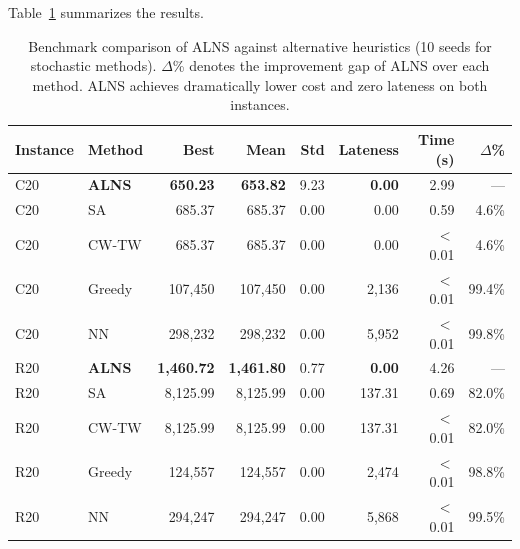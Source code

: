 \documentclass[11pt]{article}
\begin{document}
Table~\ref{tab:benchmark} summarizes the results.

\begin{table}[htbp]
\centering
\begin{tabular}{@{}llrrrrrr@{}}
\toprule
\textbf{Instance} & \textbf{Method} & \textbf{Best} & \textbf{Mean} & \textbf{Std} & \textbf{Lateness} & \textbf{Time (s)} & \textbf{$\Delta$\%} \\
\midrule
C20 & \textbf{ALNS} & \textbf{650.23} & \textbf{653.82} & 9.23 & \textbf{0.00} & 2.99 & --- \\
C20 & SA & 685.37 & 685.37 & 0.00 & 0.00 & 0.59 & 4.6\% \\
C20 & CW-TW & 685.37 & 685.37 & 0.00 & 0.00 & $<$0.01 & 4.6\% \\
C20 & Greedy & 107,450 & 107,450 & 0.00 & 2,136 & $<$0.01 & 99.4\% \\
C20 & NN & 298,232 & 298,232 & 0.00 & 5,952 & $<$0.01 & 99.8\% \\
\midrule
R20 & \textbf{ALNS} & \textbf{1,460.72} & \textbf{1,461.80} & 0.77 & \textbf{0.00} & 4.26 & --- \\
R20 & SA & 8,125.99 & 8,125.99 & 0.00 & 137.31 & 0.69 & 82.0\% \\
R20 & CW-TW & 8,125.99 & 8,125.99 & 0.00 & 137.31 & $<$0.01 & 82.0\% \\
R20 & Greedy & 124,557 & 124,557 & 0.00 & 2,474 & $<$0.01 & 98.8\% \\
R20 & NN & 294,247 & 294,247 & 0.00 & 5,868 & $<$0.01 & 99.5\% \\
\bottomrule
\end{tabular}
\caption{Benchmark comparison of ALNS against alternative heuristics (10 seeds for stochastic methods). $\Delta$\% denotes the improvement gap of ALNS over each method. ALNS achieves dramatically lower cost and zero lateness on both instances.}
\label{tab:benchmark}
\end{table}
\end{document}
